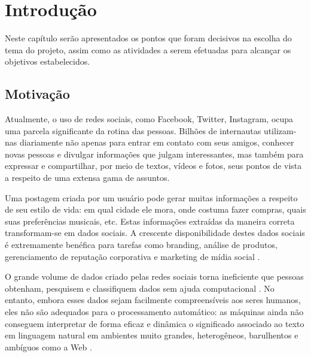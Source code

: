 \documentclass[
	12pt,				%
	openright,			%
	oneside,			%
	a4paper,			%
	english,			%
	spanish,			%
	brazil				%
	]{abntex2}
\begin{document}



 \pretextual

\imprimircapa

\tableofcontents*
\cleardoublepage


\textual

\chapter{Introdução}
	Neste capítulo serão apresentados os pontos que foram decisivos na escolha do tema do projeto, assim como as atividades a serem efetuadas para alcançar os objetivos estabelecidos.

	\section{Motivação}
	
	Atualmente, o uso de redes sociais, como Facebook, Twitter, Instagram, ocupa uma parcela significante da rotina das pessoas. Bilhões de internautas utilizam-nas diariamente não apenas para entrar em contato com seus amigos, conhecer novas pessoas e divulgar informações que julgam interessantes, mas também para expressar e compartilhar, por meio de textos, vídeos e fotos, seus pontos de vista a respeito de uma extensa gama de assuntos.
	
	Uma postagem criada por um usuário pode gerar muitas informações a respeito de seu estilo de vida: em qual cidade ele mora, onde costuma fazer compras, quais suas preferências musicais, etc. Estas informações extraídas da maneira correta transformam-se em dados sociais. A crescente disponibilidade destes dados sociais é extremamente benéfica para tarefas como branding, análise de produtos, gerenciamento de reputação corporativa e marketing de mídia social \cite{article_sentiment_analysis}. 
	
	O grande volume de dados criado pelas redes sociais torna ineficiente que pessoas obtenham, pesquisem e classifiquem dados sem ajuda computacional \cite{conference_fb}. No entanto, embora esses dados sejam facilmente compreensíveis aos seres humanos, eles não são adequados para o processamento automático: as máquinas ainda não conseguem interpretar de forma eficaz e dinâmica o significado associado ao texto em linguagem natural em ambientes muito grandes, heterogêneos, barulhentos e ambíguos como a Web \cite{article_sentiment_analysis}.
\end{document}
